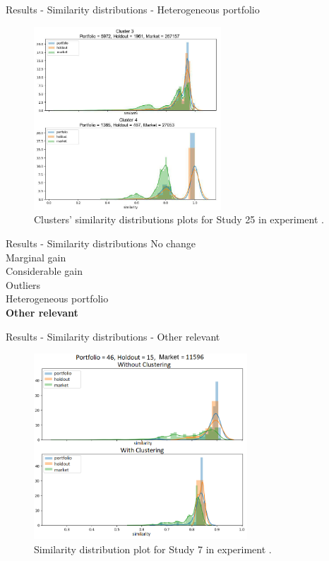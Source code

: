 \begin{frame}{Results - Similarity distributions - Heterogeneous portfolio}
    \begin{figure}
       \centering
       \includegraphics[width=7cm]{fig/ch4-study-25-clusters-simi-plot.png}
       \caption{Clusters' similarity distributions plots for Study 25 in experiment \nameExperimentI{}.}
    \end{figure}
\end{frame}


\begin{frame}{Results - Similarity distributions}
    No change \\ 
    \vspace{0.5cm}
    Marginal gain \\
    \vspace{0.5cm}
    Considerable gain \\
    \vspace{0.5cm}
    Outliers \\
    \vspace{0.5cm}
    Heterogeneous portfolio \\
    \vspace{0.5cm}
    \textbf{Other relevant} 
\end{frame}


\begin{frame}{Results - Similarity distributions - Other relevant}
    \begin{figure}
       \centering
       \includegraphics[width=8cm]{fig/ch4-worth-mentioning-study-7.png}
       \caption{Similarity distribution plot for Study 7 in experiment \nameExperimentII{}.}
       \label{fig:worth-mentioning-study-7}
    \end{figure}
\end{frame}

